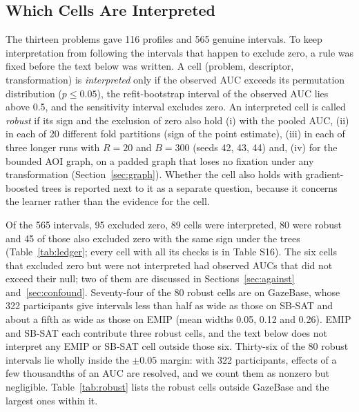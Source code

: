 \begin{table}[!htbp]
\centering\small
\caption{Observed participant-held-out AUC per problem and descriptor (within-fold AUC; class-balanced folds; linear SVM; ten-fold cross-validation over participants), with the permutation $p$-value in brackets (1000 permutations under the schemes of Table~\ref{tab:perm}; smallest attainable value 0.001). On \texttt{em\_correct} and \texttt{sb\_compr} the permutation scheme preserves part of the stimulus structure, so the permutation mean can lie well above 0.5 (Table S15) and an AUC must be read against its $p$-value. Pooled AUCs are in Table S14. A dash: descriptor not applicable.}
\label{tab:auc}
\resizebox{\linewidth}{!}{}
\end{table}

\subsection{Which Cells Are Interpreted}\label{sec:ledger}
The thirteen problems gave 116 profiles and 565 genuine intervals. To keep interpretation from following the intervals that happen to exclude zero, a rule was fixed before the text below was written. A cell (problem, descriptor, transformation) is \emph{interpreted} only if the observed AUC exceeds its permutation distribution ($p \leq 0.05$), the refit-bootstrap interval of the observed AUC lies above 0.5, and the sensitivity interval excludes zero. An interpreted cell is called \emph{robust} if its sign and the exclusion of zero also hold (i) with the pooled AUC, (ii) in each of 20 different fold partitions (sign of the point estimate), (iii) in each of three longer runs with $R = 20$ and $B = 300$ (seeds 42, 43, 44) and, (iv) for the bounded AOI graph, on a padded graph that loses no fixation under any transformation (Section~\ref{sec:graph}). Whether the cell also holds with gradient-boosted trees is reported next to it as a separate question, because it concerns the learner rather than the evidence for the cell.

Of the 565 intervals, 95 excluded zero, 89 cells were interpreted, 80 were robust and 45 of those also excluded zero with the same sign under the trees (Table~\ref{tab:ledger}; every cell with all its checks is in Table S16). The six cells that excluded zero but were not interpreted had observed AUCs that did not exceed their null; two of them are discussed in Sections~\ref{sec:against} and~\ref{sec:confound}. Seventy-four of the 80 robust cells are on GazeBase, whose 322 participants give intervals less than half as wide as those on SB-SAT and about a fifth as wide as those on EMIP (mean widths 0.05, 0.12 and 0.26). EMIP and SB-SAT each contribute three robust cells, and the text below does not interpret any EMIP or SB-SAT cell outside those six. Thirty-six of the 80 robust intervals lie wholly inside the $\pm 0.05$ margin: with 322 participants, effects of a few thousandths of an AUC are resolved, and we count them as nonzero but negligible. Table~\ref{tab:robust} lists the robust cells outside GazeBase and the largest ones within it.

